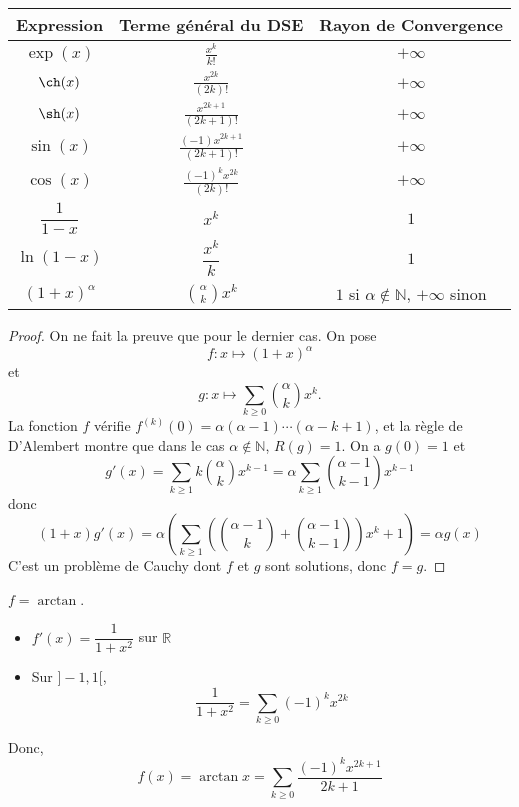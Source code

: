 \begin{thm}
    \begin{center}
        \begin{tabular}{ccc}
            \hline \hline Expression & Terme général du DSE & Rayon de Convergence \\
            \hline
            \rule{0pt}{2em} $\exp(x)$ & $\displaystyle \frac{x^k}{k!}$ & $+\infty$ \\
            \rule{0pt}{2em} $\ch(x)$ & $\displaystyle \frac{x^{2k}}{(2k)!}$ & $+\infty$ \\
            \rule{0pt}{2em} $\sh(x)$ & $\displaystyle \frac{x^{2k+1}}{(2k+1)!}$ & $+\infty$ \\
            \rule{0pt}{2em} $\sin(x)$ & $\displaystyle \frac{(-1)x^{2k+1}}{(2k+1)!}$ & $+\infty$ \\
            \rule{0pt}{2em} $\cos(x)$ & $\displaystyle \frac{(-1)^kx^{2k}}{(2k)!}$ & $+\infty$ \\
            \rule{0pt}{2em} $\dfrac1{1-x}$ & $x^k$ & $1$ \\
            \rule{0pt}{2em} $\ln(1-x)$ & $\dfrac{x^k}k$ & $1$ \\
            \rule{0pt}{2em} $(1+x)^\alpha$ & $\displaystyle \binom \alpha kx^k$ & $1$ si $\alpha\not\in\mathbb N$, $+\infty$ sinon \\[1em]
            \hline
        \end{tabular}
    \end{center}
\end{thm}

\begin{proof}
    On ne fait la preuve que pour le dernier cas. On pose \[
        f:x\longmapsto(1+x)^\alpha
    \]
    et \[
        g:x\longmapsto \sum_{k\geq 0}\binom \alpha kx^k.
    \] La fonction $f$ vérifie $f^{(k)}(0)=\alpha(\alpha-1)\cdots (\alpha-k+1)$, et la règle de D'Alembert  montre que dans le cas $\alpha \not \in \mathbb N$, $R(g)=1$. On a $g(0)=1$ et \[
    g'(x)=\sum_{k\geq 1}k\binom \alpha kx^{k-1}=\alpha\sum_{k\geq 1}\binom {\alpha-1}{k-1}x^{k-1}
\]
donc \[
    (1+x)g'(x)=\alpha \left( \sum_{k\geq 1} \left( \binom {\alpha-1}k+\binom{\alpha-1}{k-1} \right)x^k+1 \right)=\alpha g(x)
\]
C'est un problème de Cauchy dont $f$ et $g$ sont solutions, donc $f=g$.
\end{proof}

\begin{ex}
    $f=\arctan$. \begin{itemize}
        \item $f'(x)=\dfrac1{1+x^2}$ sur $\mathbb R$
        \item Sur $]-1, 1[$, \[
                \frac1{1+x^2}=\sum_{k\geq 0}(-1)^kx^{2k}
            \]
    \end{itemize}
    Donc, \[
        f(x)=\arctan x=\sum_{k\geq 0}\frac{(-1)^kx^{2k+1}}{2k+1}
    \]
\end{ex}

